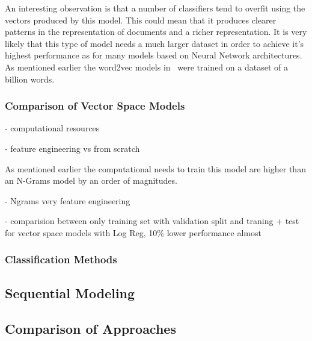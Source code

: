An interesting observation is that a number of classifiers tend to overfit using the vectors produced by this model. This could mean that it produces clearer patterns in the representation of documents and a richer representation. It is very likely that this type of model needs a much larger dataset in order to achieve it's highest performance as for many models based on Neural Network architectures. As mentioned earlier the word2vec models in~\cite{Mikolov:2013ad} were trained on a dataset of a billion words.

\subsubsection{Comparison of Vector Space Models}
\label{subs:Comparison of Vector Space Models}

- computational resources

- feature engineering vs from scratch



As mentioned earlier the computational needs to train this model are higher than an N-Grams model by an order of magnitudes.

- Ngrams very feature engineering




- comparision between only training set with validation split and traning + test for vector space models with Log Reg, 10\% lower performance almost


\subsubsection{Classification Methods}
\label{subs:Classification Methods}


\subsection{Sequential Modeling}
\label{sub:Sequential Modeling}



\subsection{Comparison of Approaches}
